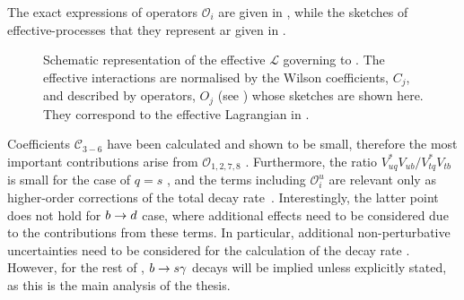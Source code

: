 The exact expressions of operators $\mathcal{O}_i$ are given in , while the sketches of effective-processes that they represent ar given in .
\begin{figure}[htbp!]
    
\caption{\label{fig:b_to_s_gamma_effective}
Schematic representation of the \SM effective $\mathcal{L}$ governing to \BtoXsgamma. 
The effective interactions are normalised by the Wilson coefficients, $C_j$, and described by operators, $O_j$ (see ) whose sketches are shown here.
They correspond to the effective Lagrangian in .
}
\end{figure}
Coefficients $\mathcal{C}_{3-6}$ have been calculated and shown to be small, therefore the most important contributions arise from $\mathcal{O}_{1,2,7,8}$ \cite{Chetyrkin:1996vx,Misiak:2020vlo}.
Furthermore, the ratio $V^*_{uq}V_{ub}/V^*_{tq}V_{tb}$ is small for the case of $q=s$ \cite{Charles:2015gya}, and the terms including $\mathcal{O}^u_i$ are relevant only as higher-order corrections of the total decay rate~\cite{Misiak:2015xwa}.
Interestingly, the latter point does not hold for $b\rightarrow d$ case, where additional effects need to be considered due to the contributions from these terms.
In particular, additional non-perturbative uncertainties need to be considered for the \SM calculation of the decay rate \cite{Misiak:2015xwa}.
However, for the rest of , $b\rightarrow s\gamma$ decays will be implied unless explicitly stated, as this is the main analysis of the thesis.

